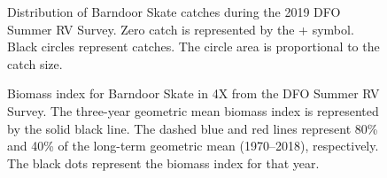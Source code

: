 \documentclass[11pt]{book}
\begin{document}
\begin{figure}[htb]

{\centering {} 

}

\caption{Distribution of Barndoor Skate catches during the 2019 DFO Summer RV Survey. Zero catch is represented by the + symbol. Black circles represent catches. The circle area is proportional to the catch size.}\label{fig:80-map-barndoorskate}
\end{figure}

\begin{figure}[htb]

{\centering {} 

}

\caption{Biomass index for Barndoor Skate in 4X from the DFO Summer RV Survey. The three-year geometric mean biomass index is represented by the solid black line. The dashed blue and red lines represent 80\% and 40\% of the long-term geometric mean (1970--2018), respectively. The black dots represent the biomass index for that year.}\label{fig:81-fig-barndoorskate-biomass4X}
\end{figure}
\end{document}
